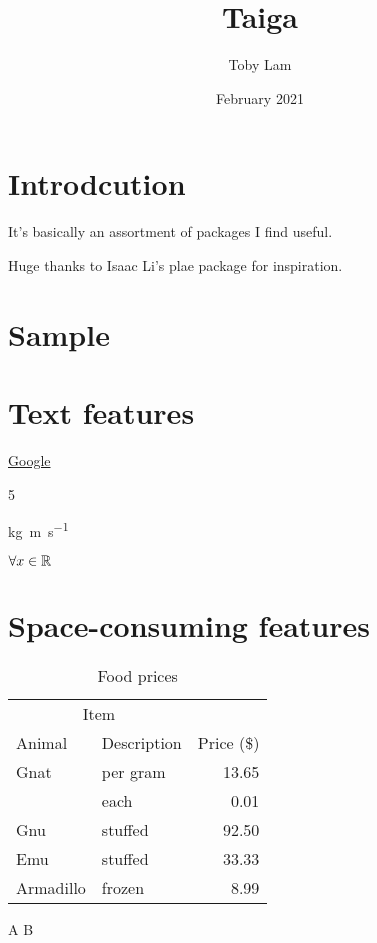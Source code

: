 \documentclass{article}
\title{Taiga}
\author{Toby Lam}
\date{February 2021}
\begin{document}
\maketitle

\section*{Introdcution}

It's basically an assortment of packages I find useful.

Huge thanks to Isaac Li's plae package for inspiration.

\listoftodos

\section{Sample}

\begin{multicols}{2}
	\lipsum[2]
\end{multicols}

\section{Text features}

\href{google.com}{Google}

5 \celsius

\si{\kilogram\metre\per\second}


$\forall x \in \mathbb{R}$

\section{Space-consuming features}

\begin{theorem}
    
\end{theorem}


\begin{table}[H]
	\centering
	\caption{Food prices}
	\begin{tabular}{@{}llr@{}}
		\toprule
		\multicolumn{2}{c}{Item} \\
		\cmidrule(r){1-2}
		Animal      & Description   & Price (\$)\\
		\midrule
		Gnat        & per gram      & 13.65 \\
		& each          & 0.01 \\
		Gnu         & stuffed       & 92.50 \\
		\addlinespace[0.1em]
		Emu         & stuffed       & 33.33 \\
		Armadillo   & frozen        & 8.99 \\ 
		\bottomrule
	\end{tabular}
\end{table}

A \textrightarrow B \bigskip \bigskip
\end{document}
